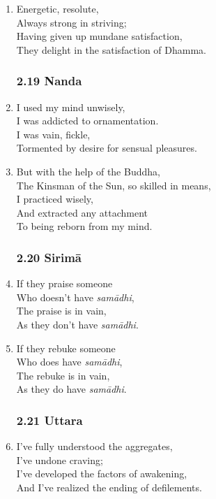 \documentclass[10pt, openany]{book}
\begin{document}
\begin{enumerate}
\item Energetic, resolute,\\
Always strong in striving;\\
Having given up mundane satisfaction,\\
They delight in the satisfaction of Dhamma.

\subsubsection*{2.19 Nanda}

\item I used my mind unwisely,\\
I was addicted to ornamentation.\\
I was vain, fickle,\\
Tormented by desire for sensual pleasures.

\item But with the help of the Buddha,\\
The Kinsman of the Sun, so skilled in means,\\
I practiced wisely,\\
And extracted any attachment \\
To being reborn from my mind.

\subsubsection*{2.20 Sirimā}

\item If they praise someone\\
Who doesn’t have \emph{samādhi},\\
The praise is in vain,\\
As they don’t have \emph{samādhi}.

\item If they rebuke someone\\
Who does have \emph{samādhi},\\
The rebuke is in vain,\\
As they do have \emph{samādhi}.

\subsubsection*{2.21 Uttara}

\item I’ve fully understood the aggregates,\\
I’ve undone craving;\\
I’ve developed the factors of awakening,\\
And I’ve realized the ending of defilements.


\end{enumerate}
\end{document}
